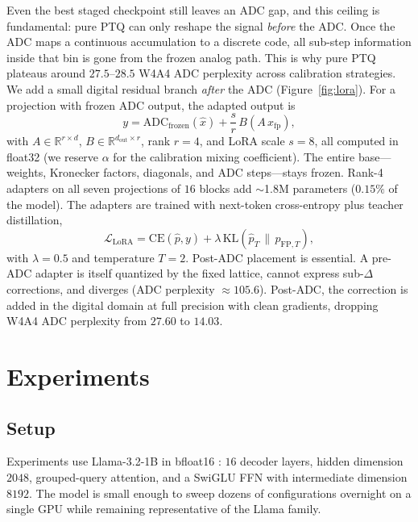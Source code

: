 \documentclass[letterpaper]{article} %
\theoremstyle{plain}
\begin{document}
Even the best staged checkpoint still leaves an ADC gap, and this ceiling is fundamental: pure PTQ can only reshape the signal \emph{before} the ADC. Once the ADC maps a continuous accumulation to a discrete code, all sub-step information inside that bin is gone from the frozen analog path. This is why pure PTQ plateaus around $27.5$--$28.5$ W4A4 ADC perplexity across calibration strategies. We add a small digital residual branch \emph{after} the ADC (Figure~\ref{fig:lora}). For a projection with frozen ADC output, the adapted output is
\begin{equation}
    y = \mathrm{ADC}_{\mathrm{frozen}}(\hat{x}) + \frac{s}{r}\,B\!\left(A\,x_{\mathrm{fp}}\right),
    \label{eq:lora}
\end{equation}
with $A \in \mathbb{R}^{r\times d}$, $B \in \mathbb{R}^{d_{\mathrm{out}}\times r}$, rank $r = 4$, and LoRA scale $s = 8$, all computed in float32 (we reserve $\alpha$ for the calibration mixing coefficient). The entire base---weights, Kronecker factors, diagonals, and ADC steps---stays frozen. Rank-4 adapters on all seven projections of $16$ blocks add $\sim$1.8M parameters ($0.15\%$ of the model). The adapters are trained with next-token cross-entropy plus teacher distillation,
\begin{equation}
    \mathcal{L}_{\mathrm{LoRA}} = \mathrm{CE}(\hat{p}, y) + \lambda\,\mathrm{KL}\!\left(\hat{p}_T \,\|\, p_{\mathrm{FP},T}\right),
    \label{eq:lora_loss}
\end{equation}
with $\lambda = 0.5$ and temperature $T = 2$. Post-ADC placement is essential. A pre-ADC adapter is itself quantized by the fixed lattice, cannot express sub-$\Delta$ corrections, and diverges (ADC perplexity $\approx 105.6$). Post-ADC, the correction is added in the digital domain at full precision with clean gradients, dropping W4A4 ADC perplexity from $27.60$ to $14.03$.

\section{Experiments}

\subsection{Setup}

Experiments use Llama-3.2-1B in bfloat16 \cite{dubey2024llama}: $16$ decoder layers, hidden dimension $2048$, grouped-query attention, and a SwiGLU FFN with intermediate dimension $8192$. The model is small enough to sweep dozens of configurations overnight on a single GPU while remaining representative of the Llama family.
\end{document}
